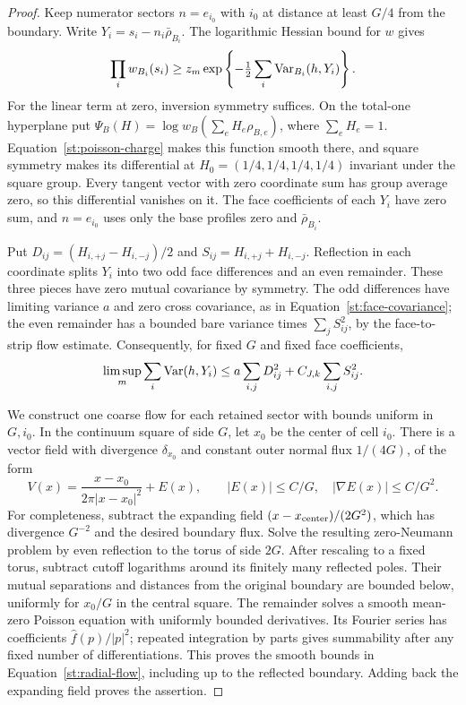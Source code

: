 \begin{proof}
Keep numerator sectors $n=e_{i_0}$ with $i_0$ at distance at least $G/4$
from the boundary. Write $Y_i=s_i-n_i\bar\rho_{B_i}$. The logarithmic Hessian
bound for $w$ gives
\begin{equation}\label{st:face-product}
 \prod_iw_{B_i}(s_i)
 \ge z_m\exp\left\{-\tfrac12\sum_i\operatorname{Var}_{B_i}(h,Y_i)\right\}.
\end{equation}
For the linear term at zero, inversion symmetry suffices. On the total-one
hyperplane put
$\Psi_B(H)=\log w_B(\sum_eH_e\rho_{B,e})$, where $\sum_eH_e=1$.
Equation~\eqref{st:poisson-charge} makes this function smooth there, and
square symmetry makes its differential at $H_0=(1/4,1/4,1/4,1/4)$
invariant under the square group. Every tangent vector with zero coordinate
sum has group average zero, so this differential vanishes on it. The face
coefficients of each $Y_i$ have zero sum, and $n=e_{i_0}$ uses only the
base profiles zero and $\bar\rho_{B_i}$.

Put $D_{ij}=(H_{i,+j}-H_{i,-j})/2$ and
$S_{ij}=H_{i,+j}+H_{i,-j}$. Reflection in each coordinate splits $Y_i$ into
two odd face differences and an even remainder. These three pieces have
zero mutual covariance by symmetry. The odd differences have limiting
variance $a$ and zero cross covariance, as in
Equation~\eqref{st:face-covariance}; the even remainder has a bounded bare
variance times $\sum_jS_{ij}^2$, by the face-to-strip flow estimate.
Consequently, for fixed $G$ and fixed face coefficients,
\begin{equation}\label{st:face-energy-bound}
 \limsup_m\sum_i\operatorname{Var}(h,Y_i)
 \le a\sum_{i,j}D_{ij}^2+C_{J,k}\sum_{i,j}S_{ij}^2.
\end{equation}

We construct one coarse flow for each retained sector with bounds uniform
in $G,i_0$. In the continuum square of side $G$, let $x_0$ be the center
of cell $i_0$. There is a vector field with divergence $\delta_{x_0}$ and
constant outer normal flux $1/(4G)$, of the form
\begin{equation}\label{st:radial-flow}
 V(x)=\frac{x-x_0}{2\pi|x-x_0|^2}+E(x),\qquad
 |E(x)|\le C/G,\quad |\nabla E(x)|\le C/G^2.
\end{equation}
For completeness, subtract the expanding field
$(x-x_{\rm center})/(2G^2)$, which has divergence $G^{-2}$ and the desired
boundary flux. Solve the resulting zero-Neumann problem by even reflection
to the torus of side $2G$. After rescaling to a fixed torus, subtract
cutoff logarithms around its finitely many reflected poles. Their mutual
separations and distances from the original boundary are bounded below,
uniformly for $x_0/G$ in the central square. The remainder solves a smooth
mean-zero Poisson equation with uniformly bounded derivatives. Its Fourier
series has coefficients $\widehat f(p)/|p|^2$; repeated integration by
parts gives summability after any fixed number of differentiations.
This proves the smooth bounds in Equation~\eqref{st:radial-flow}, including
up to the reflected boundary. Adding back the expanding field proves the
assertion.


\end{proof}

